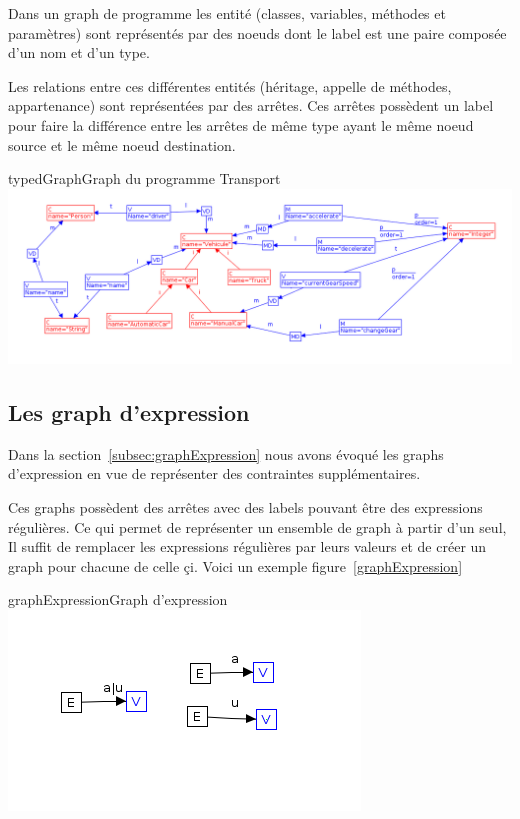 \documentclass[a4paper, 12pt]{article}
\begin{document}
Dans un graph de programme les entité (classes, variables, méthodes et paramètres) sont représentés par des noeuds dont le label est une paire composée d'un nom et d'un type.

Les relations entre ces différentes entités (héritage, appelle de méthodes, appartenance) sont représentées par des arrêtes. 
Ces arrêtes possèdent un label pour faire la différence entre les arrêtes de même type ayant le même noeud source et le même noeud destination.

\begin{myfig}{typedGraph}{Graph du programme Transport}
\includegraphics[width=\textwidth]{typedGraph.png}
\end{myfig}

\subsection{Les graph d'expression} 

Dans la section~\ref{subsec:graphExpression} nous avons évoqué les graphs d'expression en vue de représenter des contraintes supplémentaires. 

Ces graphs possèdent des arrêtes avec des labels pouvant être des expressions régulières. Ce qui permet de représenter un ensemble de graph à partir d'un seul, Il suffit de remplacer les expressions régulières par leurs valeurs et de créer un graph pour chacune de celle çi. Voici un exemple figure~\ref{graphExpression}

\begin{myfig}{graphExpression}{Graph d'expression}
\includegraphics{graphExpression.png}
\end{myfig}
\end{document}
